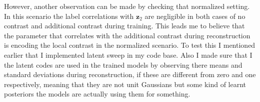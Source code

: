 \documentclass[12pt, english]{article}
\begin{document}
\par However, another observation can be made by checking that normalized setting. In this scenario the label correlations with $\bm{z}_{2}$ are negligible in both cases of no contrast and additional contrast during training. This leads me to believe that the parameter that correlates with the additional contrast during reconstruction is encoding the local contrast in the normalized scenario. To test this I mentioned earlier that I implemented latent sweep in my code base. Also I made sure that I the latent codes are used in the trained models by observing there means and standard deviations during reconstruction, if these are different from zero and one respectively, meaning that they are not unit Gaussians but some kind of learnt posteriors the models are actually using them for something.

\vspace{4mm}
\end{document}
